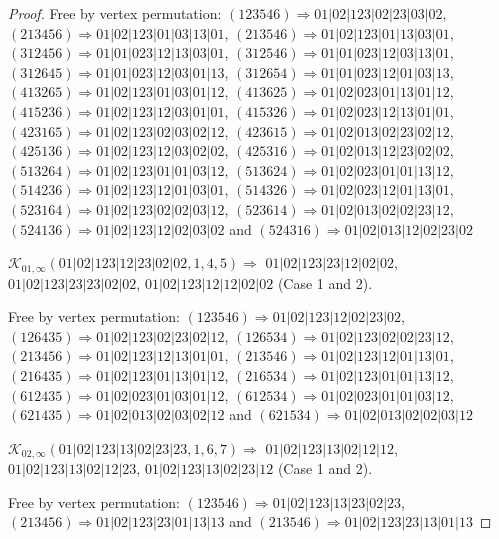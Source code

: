 \documentclass[12pt]{article}
\theoremstyle{plain}
\theoremstyle{definition}
\theoremstyle{remark}
\newcommand{\fancy}[1]{\mathcal{#1}}
\def\K{\fancy{K}}
\begin{document}
\begin{proof}
	Free by vertex permutation: $(1 2 3 5 4 6)\Rightarrow 01|02|123|02|23|03|02$, $(2 1 3 4 5 6)\Rightarrow 01|02|123|01|03|13|01$, $(2 1 3 5 4 6)\Rightarrow 01|02|123|01|13|03|01$, $(3 1 2 4 5 6)\Rightarrow 01|01|023|12|13|03|01$, $(3 1 2 5 4 6)\Rightarrow 01|01|023|12|03|13|01$, $(3 1 2 6 4 5)\Rightarrow 01|01|023|12|03|01|13$, $(3 1 2 6 5 4)\Rightarrow 01|01|023|12|01|03|13$, $(4 1 3 2 6 5)\Rightarrow 01|02|123|01|03|01|12$, $(4 1 3 6 2 5)\Rightarrow 01|02|023|01|13|01|12$, $(4 1 5 2 3 6)\Rightarrow 01|02|123|12|03|01|01$, $(4 1 5 3 2 6)\Rightarrow 01|02|023|12|13|01|01$, $(4 2 3 1 6 5)\Rightarrow 01|02|123|02|03|02|12$, $(4 2 3 6 1 5)\Rightarrow 01|02|013|02|23|02|12$, $(4 2 5 1 3 6)\Rightarrow 01|02|123|12|03|02|02$, $(4 2 5 3 1 6)\Rightarrow 01|02|013|12|23|02|02$, $(5 1 3 2 6 4)\Rightarrow 01|02|123|01|01|03|12$, $(5 1 3 6 2 4)\Rightarrow 01|02|023|01|01|13|12$, $(5 1 4 2 3 6)\Rightarrow 01|02|123|12|01|03|01$, $(5 1 4 3 2 6)\Rightarrow 01|02|023|12|01|13|01$, $(5 2 3 1 6 4)\Rightarrow 01|02|123|02|02|03|12$, $(5 2 3 6 1 4)\Rightarrow 01|02|013|02|02|23|12$, $(5 2 4 1 3 6)\Rightarrow 01|02|123|12|02|03|02$ and $(5 2 4 3 1 6)\Rightarrow 01|02|013|12|02|23|02$
	
	
	\bigskip
	
	$\K_{01,\infty}(01|02|123|12|23|02|02,1, 4, 5)\Rightarrow $ $01|02|123|23|12|02|02$, $01|02|123|23|23|02|02$, $01|02|123|12|12|02|02$ (Case 1 and 2).
	
	
	
	Free by vertex permutation: $(1 2 3 5 4 6)\Rightarrow 01|02|123|12|02|23|02$, $(1 2 6 4 3 5)\Rightarrow 01|02|123|02|23|02|12$, $(1 2 6 5 3 4)\Rightarrow 01|02|123|02|02|23|12$, $(2 1 3 4 5 6)\Rightarrow 01|02|123|12|13|01|01$, $(2 1 3 5 4 6)\Rightarrow 01|02|123|12|01|13|01$, $(2 1 6 4 3 5)\Rightarrow 01|02|123|01|13|01|12$, $(2 1 6 5 3 4)\Rightarrow 01|02|123|01|01|13|12$, $(6 1 2 4 3 5)\Rightarrow 01|02|023|01|03|01|12$, $(6 1 2 5 3 4)\Rightarrow 01|02|023|01|01|03|12$, $(6 2 1 4 3 5)\Rightarrow 01|02|013|02|03|02|12$ and $(6 2 1 5 3 4)\Rightarrow 01|02|013|02|02|03|12$
	
	
	\bigskip
	
	$\K_{02,\infty}(01|02|123|13|02|23|23,1, 6, 7)\Rightarrow $ $01|02|123|13|02|12|12$, $01|02|123|13|02|12|23$, $01|02|123|13|02|23|12$ (Case 1 and 2).
	
	
	
	Free by vertex permutation: $(1 2 3 5 4 6)\Rightarrow 01|02|123|13|23|02|23$, $(2 1 3 4 5 6)\Rightarrow 01|02|123|23|01|13|13$ and $(2 1 3 5 4 6)\Rightarrow 01|02|123|23|13|01|13$
	

\end{proof}
\end{document}

